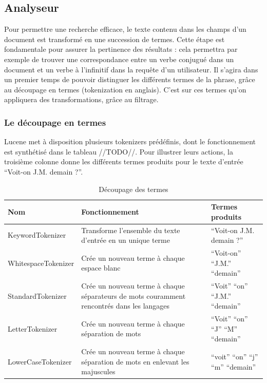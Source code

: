 \subsection{Analyseur}

Pour permettre une recherche efficace, le texte contenu dans les champs d’un document est transformé en une succession de termes. Cette étape est fondamentale pour assurer la pertinence des résultats : cela permettra par exemple de trouver une correspondance entre un verbe conjugué dans un document et un verbe à l’infinitif dans la requête d’un utilisateur. Il s’agira dans un premier temps de pouvoir distinguer les différents termes de la phrase, grâce au découpage en termes (tokenization en anglais). C’est sur ces termes qu’on appliquera des transformations, grâce au filtrage.

\subsubsection{Le découpage en termes}
\label{section:tokenizer}

Lucene met à disposition plusieurs tokenizers prédéfinis, dont le fonctionnement est synthétisé dans le tableau //TODO//. Pour illustrer leurs actions, la troisième colonne donne les différents termes produits pour le texte d’entrée “Voit-on J.M. demain ?”.
 
            \begin{table}[!htbp]
                \centering
                \begin{tabular}{|p{4.5cm}|p{4.5cm}|p{4.5cm}|}
                    \hline
                    \textbf{Nom} & \textbf{Fonctionnement} & \textbf{Termes produits}\\
                    \hline
                    KeywordTokenizer & Transforme l’ensemble du texte d’entrée en un unique terme & “Voit-on J.M. demain ?”\\
		\hline
                    WhitespaceTokenizer & Crée un nouveau terme à chaque espace blanc & “Voit-on” “J.M.” “demain”\\
		\hline
                    StandardTokenizer & Crée un nouveau terme à chaque séparateurs de mots couramment rencontrés dans les langages & “Voit” “on” “J.M.” “demain”\\
		\hline
                    LetterTokenizer & Crée un nouveau terme à chaque séparation de mots & “Voit” “on” “J” “M” “demain”\\
		\hline
                    LowerCaseTokenizer & Crée un nouveau terme à chaque séparation de mots en enlevant les majuscules & “voit” “on” “j” “m” “demain”\\
                    \hline

                \end{tabular}
                \caption{Découpage des termes}
                \label{tab:decoupage_termes}
            \end{table}

